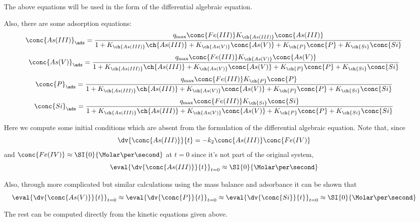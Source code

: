 \documentclass[11pt]{scrartcl} %
\begin{document}
    The above equations will be used in the form of the differential algebraic equation.

    Also, there are some adsorption equations:
    \[\conc{As (III)}_\ads = \frac{q_{\max}\conc{Fe(III)}K_{\ch{As (III)}} \conc{As(III)}}{1 + K_{\ch{As (III)}}\ch{As(III)} + K_{\ch{As (V)}}\conc{As (V)} + K_{\ch{P}}\conc{P} + K_{\ch{Si}}\conc{Si}}\]
    \[\conc{As (V)}_\ads = \frac{q_{\max}\conc{Fe(III)}K_{\ch{As (V)}} \conc{As(V)}}{1 + K_{\ch{As (III)}}\ch{As(III)} + K_{\ch{As (V)}}\conc{As (V)} + K_{\ch{P}}\conc{P} + K_{\ch{Si}}\conc{Si}}\]
    \[\conc{P}_\ads = \frac{q_{\max}\conc{Fe(III)}K_{\ch{P}} \conc{P}}{1 + K_{\ch{As (III)}}\ch{As(III)} + K_{\ch{As (V)}}\conc{As (V)} + K_{\ch{P}}\conc{P} + K_{\ch{Si}}\conc{Si}}\]
    \[\conc{Si}_\ads = \frac{q_{\max}\conc{Fe(III)}K_{\ch{Si}} \conc{Si}}{1 + K_{\ch{As (III)}}\ch{As(III)} + K_{\ch{As (V)}}\conc{As (V)} + K_{\ch{P}}\conc{P} + K_{\ch{Si}}\conc{Si}}\]

    Here we compute some initial conditions which are absent from the formulation of the differential algebraic equation.
    Note that, since
    \[\dv{\conc{As (III)}}{t} = -k_2\conc{As (III)}\conc{Fe (IV)}\]
    and $\conc{Fe (IV)} \approx \SI{0}{\Molar\per\second}$ at $t = 0$ since it's not part of the original system,
    \[\eval{\dv{\conc{As (III)}}{t}}_{t = 0} \approx \SI{0}{\Molar\per\second}\]

    Also, through more complicated but similar calculations using the mass balance and adsorbance it can be shown that
    \[\eval{\dv{\conc{As (V)}}{t}}_{t = 0} \approx \eval{\dv{\conc{P}}{t}}_{t = 0} \approx \eval{\dv{\conc{Si}}{t}}_{t = 0} \approx \SI{0}{\Molar\per\second}\]

    The rest can be computed directly from the kinetic equations given above.
\end{document}
